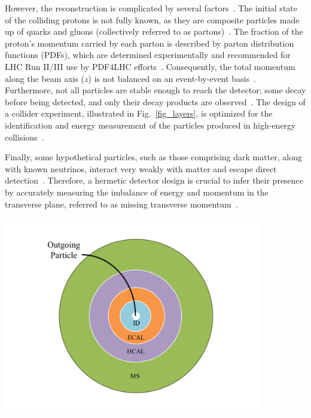 However, the reconstruction is complicated by several factors~\cite{CMS:2008xjf,CMS:PF2017}. The initial state of the colliding protons is not fully known, as they are composite particles made up of quarks and gluons (collectively referred to as partons)~\cite{Collins:1989,NNPDF:2014otw}. The fraction of the proton's momentum carried by each parton is described by parton distribution functions (PDFs), which are determined experimentally and recommended for LHC Run II/III use by PDF4LHC efforts~\cite{Butterworth:2015oua,NNPDF:2014otw}. Consequently, the total momentum along the beam axis ($z$) is not balanced on an event-by-event basis~\cite{Collins:1989}. Furthermore, not all particles are stable enough to reach the detector; some decay before being detected, and only their decay products are observed~\cite{1674-1137-40-10-100001}. The design of a collider experiment, illustrated in Fig.~\ref{fig_layers}, is optimized for the identification and energy measurement of the particles produced in high-energy collisions~\cite{CMS:2008xjf,deFavereau:2013fsa}.

Finally, some hypothetical particles, such as those comprising dark matter, along with known neutrinos, interact very weakly with matter and escape direct detection~\cite{Bertone2005_DM_review,1674-1137-40-10-100001}. Therefore, a hermetic detector design is crucial to infer their presence by accurately measuring the imbalance of energy and momentum in the transverse plane, referred to as missing transverse momentum~\cite{CMS:2019ctu,CMS:PF2017}.


\begin{center}
    \includegraphics[width=0.85\textwidth]{Images/transversal_detector.pdf}
    \label{fig_detector}
\end{center}

